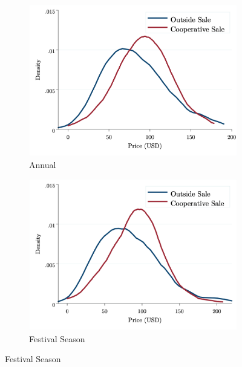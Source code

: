 \documentclass[11pt]{article}
\begin{document}
\begin{figure}[H]
\caption{Distribution of Goat Prices by Sale Channel}
    \centering
    \begin{subfigure}[t]{.4\textwidth}
    \centering
        \caption{Annual} \label{figure:E2_PD_Annual}
        \includegraphics[width=\linewidth,trim=4 4 4 4,clip]{E2_PriceDensity_Annual.png} 
    \end{subfigure}
    \hspace{.5cm}
    \vspace{.5cm}
    \begin{subfigure}[t]{0.4\textwidth}
        \centering
        \caption{Festival Season} \label{figure:E2_PD_Festival}
        \includegraphics[width=\linewidth,trim=4 4 4 4,clip]{E2_PriceDensity_Festival.png} 

\end{subfigure}
\end{figure}
\end{document}
